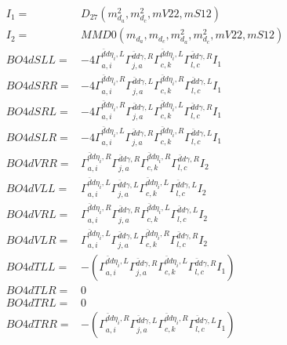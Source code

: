 \documentclass[A4,landscape]{article}
\begin{document}
\begin{align} 
I_1 = & D_{27}(m^2_{d_{{a}}}, m^2_{d_{{c}}}, mV22, mS12) \\ 
I_2 = & MMD0(m_{d_{{a}}}, m_{d_{{c}}}, m^2_{d_{{a}}}, m^2_{d_{{c}}}, mV22, mS12) \\ 
  BO4dSLL= & -4  \Gamma^{\bar{d}d \eta_i ,L}_{a, i} \Gamma^{\bar{d}d \gamma ,R}_{j, a} \Gamma^{\bar{d}d \eta_i ,L}_{c, k} \Gamma^{\bar{d}d \gamma ,R}_{l, c} I_1 \\ 
  BO4dSRR= & -4  \Gamma^{\bar{d}d \eta_i ,R}_{a, i} \Gamma^{\bar{d}d \gamma ,L}_{j, a} \Gamma^{\bar{d}d \eta_i ,R}_{c, k} \Gamma^{\bar{d}d \gamma ,L}_{l, c} I_1 \\ 
  BO4dSRL= & -4  \Gamma^{\bar{d}d \eta_i ,R}_{a, i} \Gamma^{\bar{d}d \gamma ,L}_{j, a} \Gamma^{\bar{d}d \eta_i ,L}_{c, k} \Gamma^{\bar{d}d \gamma ,R}_{l, c} I_1 \\ 
  BO4dSLR= & -4  \Gamma^{\bar{d}d \eta_i ,L}_{a, i} \Gamma^{\bar{d}d \gamma ,R}_{j, a} \Gamma^{\bar{d}d \eta_i ,R}_{c, k} \Gamma^{\bar{d}d \gamma ,L}_{l, c} I_1 \\ 
  BO4dVRR= &  \Gamma^{\bar{d}d \eta_i ,R}_{a, i} \Gamma^{\bar{d}d \gamma ,R}_{j, a} \Gamma^{\bar{d}d \eta_i ,R}_{c, k} \Gamma^{\bar{d}d \gamma ,R}_{l, c} I_2 \\ 
  BO4dVLL= &  \Gamma^{\bar{d}d \eta_i ,L}_{a, i} \Gamma^{\bar{d}d \gamma ,L}_{j, a} \Gamma^{\bar{d}d \eta_i ,L}_{c, k} \Gamma^{\bar{d}d \gamma ,L}_{l, c} I_2 \\ 
  BO4dVRL= &  \Gamma^{\bar{d}d \eta_i ,R}_{a, i} \Gamma^{\bar{d}d \gamma ,R}_{j, a} \Gamma^{\bar{d}d \eta_i ,L}_{c, k} \Gamma^{\bar{d}d \gamma ,L}_{l, c} I_2 \\ 
  BO4dVLR= &  \Gamma^{\bar{d}d \eta_i ,L}_{a, i} \Gamma^{\bar{d}d \gamma ,L}_{j, a} \Gamma^{\bar{d}d \eta_i ,R}_{c, k} \Gamma^{\bar{d}d \gamma ,R}_{l, c} I_2 \\ 
  BO4dTLL= & -( \Gamma^{\bar{d}d \eta_i ,L}_{a, i} \Gamma^{\bar{d}d \gamma ,R}_{j, a} \Gamma^{\bar{d}d \eta_i ,L}_{c, k} \Gamma^{\bar{d}d \gamma ,R}_{l, c} I_1) \\ 
  BO4dTLR= & 0 \\ 
  BO4dTRL= & 0 \\ 
  BO4dTRR= & -( \Gamma^{\bar{d}d \eta_i ,R}_{a, i} \Gamma^{\bar{d}d \gamma ,L}_{j, a} \Gamma^{\bar{d}d \eta_i ,R}_{c, k} \Gamma^{\bar{d}d \gamma ,L}_{l, c} I_1) \\ 
\end{align} 
\end{document}
